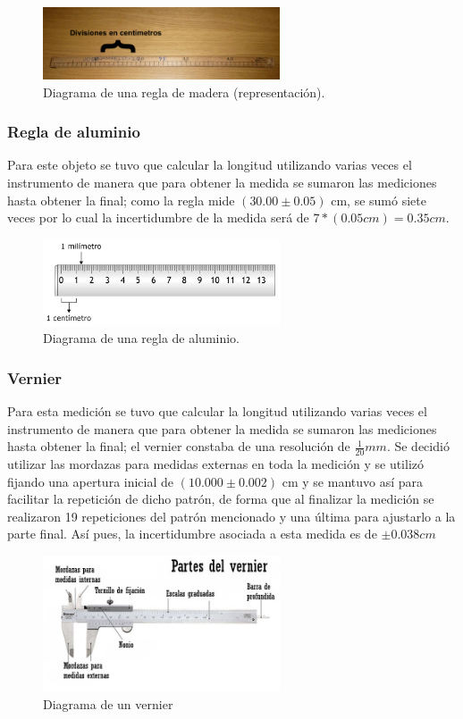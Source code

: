 \documentclass{article}
\begin{document}
\begin{figure}[H]
    \centering
    \includegraphics[width=7cm]{Untitled.png}%
    \caption{Diagrama de una regla de madera (representación).}%
\end{figure}

\subsubsection{Regla de aluminio}
Para este objeto se tuvo que calcular la longitud utilizando varias veces el instrumento de manera que para obtener la medida se sumaron las mediciones hasta obtener la final; como la regla mide $( 30.00 \pm 0.05 )$ cm, se sumó siete veces por lo cual la incertidumbre de la medida será de  $7*(0.05cm) = 0.35cm$.

\begin{figure}[H]
    \centering
    \includegraphics[width=7cm]{act31_2.jpg}%
    \caption{Diagrama de una regla de aluminio.}%
\end{figure}

\subsubsection{Vernier}
Para esta medición se tuvo que calcular la longitud utilizando varias veces el instrumento de manera que para obtener la medida se sumaron las mediciones hasta obtener la final; el vernier constaba de una resolución de $\frac{1}{20} mm$. Se decidió utilizar las mordazas para medidas externas en toda la medición y se utilizó fijando una apertura inicial de $( 10.000 \pm 0.002 )$ cm y se mantuvo así para facilitar la repetición de dicho patrón, de forma que al finalizar la medición se realizaron 19 repeticiones del patrón mencionado y una última para ajustarlo a la parte final. Así pues, la incertidumbre asociada a esta medida es de $\pm 0.038 cm$

\begin{figure}[H]
    \centering
    \includegraphics[width=7cm]{partes-vernier.jpg}%
    \caption{Diagrama de un vernier}%
\end{figure}
\end{document}
